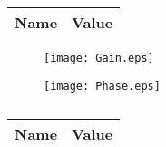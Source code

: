 \begin{table}[h]
  \centering
  \begin{tabular}{|l|r|}
    \hline    
    {\bf Name} & {\bf Value} \\ \hline
    
  \end{tabular}
	\caption{}
  \label{tab:total}
\end{table}

 


\begin{figure}[h] \centering
\texttt{[image: Gain.eps]}
	\caption{}
\label{fig:gain}
\end{figure}


\begin{figure}[h] \centering
\texttt{[image: Phase.eps]}
	\caption{}
\label{fig:phase}
\end{figure}




\begin{table}[h]
  \centering
  \begin{tabular}{|l|r|}
    \hline    
    {\bf Name} & {\bf Value} \\ \hline
    
  \end{tabular}
  \caption{}
  \label{tab:simtab}
\end{table}



